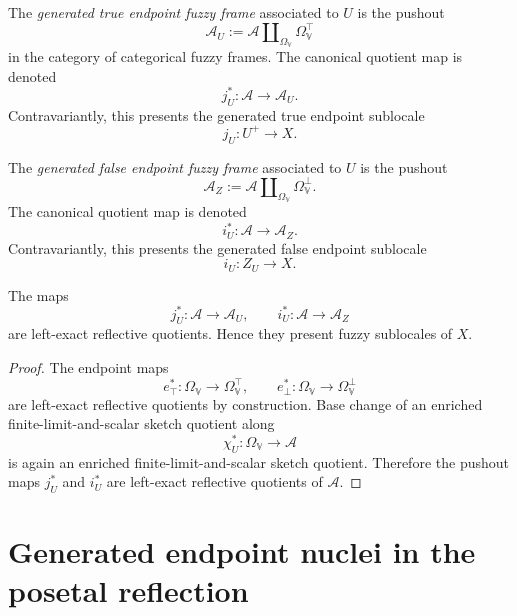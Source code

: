 \begin{definition}
\label{def:generated-true-endpoint-frame}
The \emph{generated true endpoint fuzzy frame} associated to \(U\) is the
pushout
\[
    \mathcal A_U
    :=
    \mathcal A
    \amalg_{\Omega_{\mathbb V}}
    \Omega_{\mathbb V}^{\top}
\]
in the category of categorical fuzzy frames.  The canonical quotient map is
denoted
\[
    j_U^\ast:\mathcal A\to\mathcal A_U.
\]
Contravariantly, this presents the generated true endpoint sublocale
\[
    j_U:U^{+}\to X.
\]
\end{definition}

\begin{definition}
\label{def:generated-false-endpoint-frame}
The \emph{generated false endpoint fuzzy frame} associated to \(U\) is the
pushout
\[
    \mathcal A_Z
    :=
    \mathcal A
    \amalg_{\Omega_{\mathbb V}}
    \Omega_{\mathbb V}^{\bot}.
\]
The canonical quotient map is denoted
\[
    i_U^\ast:\mathcal A\to\mathcal A_Z.
\]
Contravariantly, this presents the generated false endpoint sublocale
\[
    i_U:Z_U\to X.
\]
\end{definition}

\begin{proposition}
\label{prop:generated-endpoint-parts-are-sublocales}
The maps
\[
    j_U^\ast:\mathcal A\to\mathcal A_U,
    \qquad
    i_U^\ast:\mathcal A\to\mathcal A_Z
\]
are left-exact reflective quotients.  Hence they present fuzzy sublocales of
\(X\).
\end{proposition}

\begin{proof}
The endpoint maps
\[
    e_{\top}^{\ast}:\Omega_{\mathbb V}\to\Omega_{\mathbb V}^{\top},
    \qquad
    e_{\bot}^{\ast}:\Omega_{\mathbb V}\to\Omega_{\mathbb V}^{\bot}
\]
are left-exact reflective quotients by construction.  Base change of an
enriched finite-limit-and-scalar sketch quotient along
\[
    \chi_U^\ast:\Omega_{\mathbb V}\to\mathcal A
\]
is again an enriched finite-limit-and-scalar sketch quotient.  Therefore the
pushout maps \(j_U^\ast\) and \(i_U^\ast\) are left-exact reflective quotients
of \(\mathcal A\).
\end{proof}

\section{Generated endpoint nuclei in the posetal reflection}
\label{sec:generated-endpoint-nuclei-posetal}

